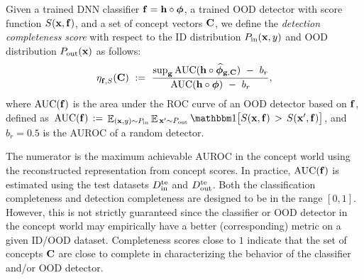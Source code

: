 \begin{definition}
\label{def:completeness_detec}
Given a trained DNN classifier $\mathbf{f} = \mathbf{h} \circ \bm{\phi}$, a trained OOD detector with score function $S(\mathbf{x}, \mathbf{f})$, and a set of concept vectors $\mathbf{C}$, we define the {\em detection completeness score} with respect to the ID distribution $P_{\textrm{in}}(\mathbf{x}, y)$ and OOD distribution $P_{\textrm{out}}(\mathbf{x})$ as follows:
\begin{align}
\label{equ: completeness-detection}
    \eta^{}_{\mathbf{f}, S}(\mathbf{C}) 
    ~:=~ \frac{\textrm{sup}_{\mathbf{g}} \,\textrm{AUC}(\mathbf{h} \circ \widehat{\bm{\phi}}_{\mathbf{g}, \mathbf{C}}) ~-~ b_r}{\textrm{AUC}(\mathbf{h} \circ \bm{\phi}) ~-~ b_r},
\end{align}
where $\textrm{AUC}(\mathbf{f})$ is the area under the ROC curve of an OOD detector based on $\mathbf{f}$, defined as $\,\textrm{AUC}(\bff) \,:=\, \expec_{(\bfx, y) \sim \Pin} \expec_{\,\bfx^\prime \sim \Pout} \indicator\big[ S(\bfx, \bff) \,>\, S(\bfx^\prime, \bff) \big]$,
%
%
and $b_r = 0.5$ is the AUROC of a random detector.
\end{definition}

The numerator is the maximum achievable AUROC in the concept world using the reconstructed representation from concept scores.
In practice, $\textrm{AUC}(\mathbf{f})$ is estimated using the test datasets $D_{\textrm{in}}^{\textrm{te}}$ and $D_{\textrm{out}}^{\textrm{te}}$.
%
%
Both the classification completeness and detection completeness are designed to be in the range $[0, 1]$. However, this is not strictly guaranteed since the classifier or OOD detector in the concept world may empirically have a better (corresponding) metric on a given ID/OOD dataset.
Completeness scores close to $1$ indicate that the set of concepts $\mathbf{C}$ are close to complete in characterizing the behavior of the classifier and/or OOD detector.

